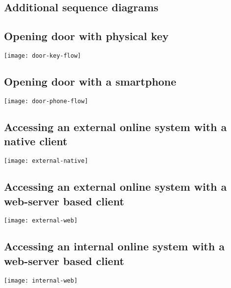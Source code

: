 \begin{landscape}
\section{Additional sequence diagrams}\label{appendix:diagrams}
\subsection{Opening door with physical key}
% 
\begin{minipage}{\textwidth}
    \texttt{[image: door-key-flow]}
\end{minipage}
% 
\subsection{Opening door with a smartphone}
\begin{minipage}{\textwidth}
    \texttt{[image: door-phone-flow]}
\end{minipage}
% 
\subsection{Accessing an external online system with a native client}
\begin{minipage}{\textwidth}
    \texttt{[image: external-native]}
\end{minipage}
% 
\subsection{Accessing an external online system with a web-server based client}
\begin{minipage}{\textwidth}
    \texttt{[image: external-web]}
\end{minipage}
% 
\subsection{Accessing an internal online system with a web-server based client}
\begin{minipage}{\textwidth}
    \texttt{[image: internal-web]}
\end{minipage}
\end{landscape}